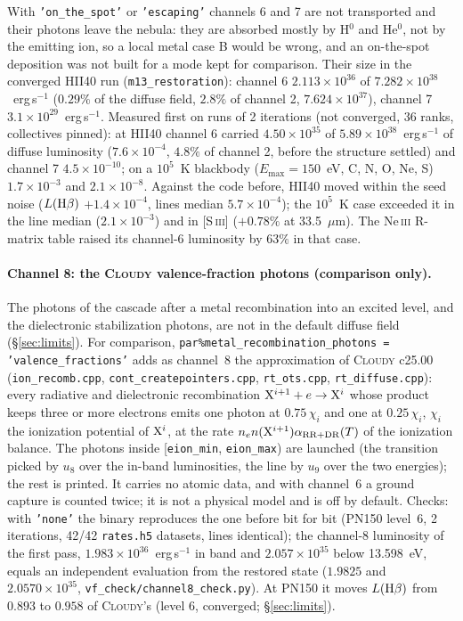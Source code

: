\documentclass[english,a4paper]{my_memo}
\newcommand{\code}[1]{\texttt{#1}}
\begin{document}
With \code{'on\_the\_spot'} or \code{'escaping'} channels 6 and 7 are not
transported and their photons leave the nebula: they are absorbed mostly by
H$^0$ and He$^0$, not by the emitting ion, so a local metal case B would be
wrong, and an on-the-spot deposition was not built for a mode kept for
comparison.  Their size in the converged HII40 run
(\code{m13\_restoration}): channel 6 $2.113{\times}10^{36}$ of
$7.282{\times}10^{38}$~erg\,s$^{-1}$ ($0.29\%$ of the diffuse field, $2.8\%$
of channel 2, $7.624{\times}10^{37}$), channel 7
$3.1{\times}10^{29}$~erg\,s$^{-1}$.  Measured first on runs of 2 iterations
(not converged, 36 ranks, collectives pinned): at HII40 channel 6 carried
$4.50{\times}10^{35}$ of $5.89{\times}10^{38}$~erg\,s$^{-1}$ of diffuse
luminosity ($7.6{\times}10^{-4}$, $4.8\%$ of channel 2, before the
structure settled) and channel 7 $4.5{\times}10^{-10}$; on a $10^5$~K blackbody ($E_{\max} = 150$~eV, C, N,
O, Ne, S) $1.7{\times}10^{-3}$ and $2.1{\times}10^{-8}$.  Against the
code before, HII40 moved within the seed noise ($L({\rm H}\beta)$
$+1.4{\times}10^{-4}$, lines median $5.7{\times}10^{-4}$); the $10^5$~K
case exceeded it in the line median ($2.1{\times}10^{-3}$) and in
[S\,\textsc{iii}] ($+0.78\%$ at 33.5~$\mu$m).  The Ne\,\textsc{iii}
R-matrix table raised its channel-6 luminosity by $63\%$ in that case.

\paragraph{Channel 8: the \textsc{Cloudy} valence-fraction photons
(comparison only).}  The photons of the cascade after a metal
recombination into an excited level, and the dielectronic stabilization
photons, are not in the default diffuse field (\S\ref{sec:limits}).  For
comparison, \code{par\%metal\_recombination\_photons = 'valence\_fractions'}
adds as channel~8 the approximation of \textsc{Cloudy} c25.00
(\code{ion\_recomb.cpp}, \code{cont\_createpointers.cpp},
\code{rt\_ots.cpp}, \code{rt\_diffuse.cpp}): every radiative and
dielectronic recombination ${\rm X}^{i+1} + e \to {\rm X}^{i}$ whose
product keeps three or more electrons emits one photon at $0.75\,\chi_i$
and one at $0.25\,\chi_i$, $\chi_i$ the ionization potential of ${\rm
X}^{i}$, at the rate $n_e n({\rm X}^{i+1}) \alpha_{\rm RR+DR}(T)$ of the
ionization balance.  The photons inside [\code{eion\_min},
\code{eion\_max}) are launched (the transition picked by $u_8$ over the
in-band luminosities, the line by $u_9$ over the two energies); the rest
is printed.  It carries no atomic data, and with channel~6 a ground
capture is counted twice; it is not a physical model and is off by
default.  Checks: with \code{'none'} the binary reproduces the one before
bit for bit (PN150 level~6, 2 iterations, 42/42 \code{rates.h5} datasets,
lines identical); the channel-8 luminosity of the first pass,
$1.983{\times}10^{36}$~erg\,s$^{-1}$ in band and
$2.057{\times}10^{35}$ below 13.598~eV, equals an independent evaluation
from the restored state ($1.9825$ and $2.0570{\times}10^{35}$,
\code{vf\_check/channel8\_check.py}).  At PN150 it moves $L({\rm
H}\beta)$ from $0.893$ to $0.958$ of \textsc{Cloudy}'s (level 6, converged;
\S\ref{sec:limits}).
\end{document}
